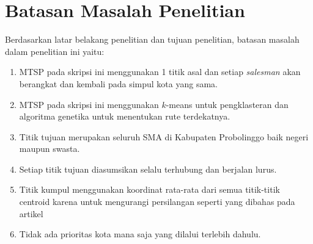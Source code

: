 \section{Batasan Masalah Penelitian}

Berdasarkan latar belakang penelitian dan tujuan penelitian, batasan masalah dalam penelitian ini yaitu:

\begin{enumerate}
	\item MTSP pada skripsi ini menggunakan 1 titik asal dan setiap \textit{salesman} akan berangkat dan kembali pada simpul kota yang sama.
	\item MTSP pada skripsi ini menggunakan $k$-means untuk pengklasteran dan algoritma genetika untuk menentukan rute terdekatnya.
	\item Titik tujuan merupakan seluruh SMA di Kabupaten Probolinggo baik negeri maupun swasta.
	\item Setiap titik tujuan diasumsikan selalu terhubung dan berjalan lurus.
	\item Titik kumpul menggunakan koordinat rata-rata dari semua titik-titik centroid karena untuk mengurangi persilangan seperti yang dibahas pada artikel \cite{inproceedings}
	\item Tidak ada prioritas kota mana saja yang dilalui terlebih dahulu.
\end{enumerate}